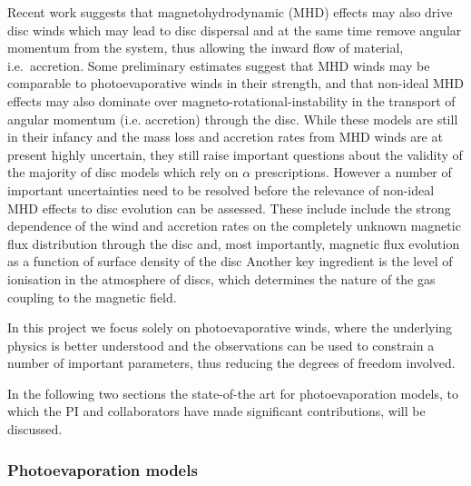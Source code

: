 \documentclass[10pt,fleqn,twoside]{article}
\begin{document}
Recent work suggests that magnetohydrodynamic (MHD) effects may also
drive disc winds 
\citep[e.g.,]{2013ApJ...769...76B}
which may lead to disc
dispersal and at the same time remove angular momentum from the
system, thus allowing the inward flow of material, i.e.\ accretion. 
Some preliminary estimates suggest that MHD winds may be 
comparable to photoevaporative winds in their strength, and that
non-ideal MHD effects may also dominate over
magneto-rotational-instability  \citep[MRI, ]{1991ApJ...376..214B} in the transport of
angular momentum (i.e. accretion) through the disc. 
While these models are still in their infancy and the
mass loss and accretion rates from MHD winds are at present highly
uncertain, they still raise important questions about the validity of
the majority of 
disc models which rely on $\alpha$ prescriptions. However a number of
important uncertainties need to be resolved before the relevance of
non-ideal MHD effects to disc evolution can be assessed. These include
include the strong dependence of the wind and
accretion rates on the completely unknown magnetic flux distribution
through the disc and, most importantly, magnetic flux evolution as a
function of surface density of the disc 
\citep[e.g.\ discussion in][]{2013ApJ...778L..14A} 
Another key ingredient is the level of ionisation in the
atmosphere of discs, which determines the nature of the gas coupling to
the magnetic field. 

In this project we focus solely on photoevaporative winds, where the
underlying physics is better understood and the observations can be
used to constrain a number of important parameters, thus reducing the
degrees of freedom involved. 

In the following two sections the state-of-the art for photoevaporation
models, to which the PI and collaborators have made significant contributions, will be discussed.
 
\subsubsection{Photoevaporation models} 
\end{document}
